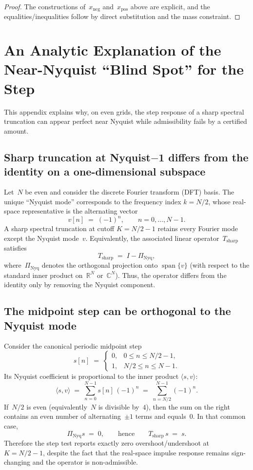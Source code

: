 \documentclass[11pt,a4paper]{article}
\theoremstyle{plain}
\theoremstyle{definition}
\theoremstyle{plain}
\newcommand{\R}{\mathbb{R}}
\newcommand{\xneg}{x_{\mathrm{neg}}}
\newcommand{\xpos}{x_{\mathrm{pos}}}
\DeclareMathOperator{\spn}{span}
\begin{document}
\begin{proof}
The constructions of~$\xneg$ and~$\xpos$ above are explicit, and the
equalities/inequalities follow by direct substitution and the mass constraint.
\end{proof}


\section{An Analytic Explanation of the Near-Nyquist ``Blind Spot'' for the Step}
\label{app:blind-spot}

This appendix explains why, on even grids, the step response of a sharp spectral
truncation can appear perfect near Nyquist while admissibility fails by a
certified amount.


\subsection{Sharp truncation at Nyquist$-$1 differs from the identity on a
  one-dimensional subspace}
\label{app:subspace}

Let~$N$ be even and consider the discrete Fourier transform (DFT) basis.  The
unique ``Nyquist mode'' corresponds to the frequency index $k = N/2$, whose
real-space representative is the alternating vector
\[
  v[n] \;=\; (-1)^n, \qquad n = 0, \dots, N-1.
\]
A sharp spectral truncation at cutoff $K = N/2-1$ retains every Fourier mode
except the Nyquist mode~$v$.  Equivalently, the associated linear
operator~$T_{\mathrm{sharp}}$ satisfies
\[
  T_{\mathrm{sharp}} \;=\; I - \Pi_{\mathrm{Nyq}},
\]
where~$\Pi_{\mathrm{Nyq}}$ denotes the orthogonal projection onto
$\spn\{v\}$ (with respect to the standard inner product on~$\R^N$
or~$\mathbb{C}^N$).  Thus, the operator differs from the identity only by
removing the Nyquist component.


\subsection{The midpoint step can be orthogonal to the Nyquist mode}
\label{app:orthogonal}

Consider the canonical periodic midpoint step
\[
  s[n] \;=\;
  \begin{cases}
    0, & 0 \le n \le N/2-1,\\
    1, & N/2 \le n \le N-1.
  \end{cases}
\]
Its Nyquist coefficient is proportional to the inner product
$\langle s, v \rangle$:
\[
  \langle s, v \rangle
  \;=\;
  \sum_{n=0}^{N-1} s[n]\,(-1)^n
  \;=\;
  \sum_{n=N/2}^{N-1} (-1)^n.
\]
If~$N/2$ is even (equivalently~$N$ is divisible by~$4$), then the sum on the
right contains an even number of alternating~$\pm 1$ terms and equals~$0$.  In
that common case,
\[
  \Pi_{\mathrm{Nyq}} s \;=\; 0,
  \qquad\text{hence}\qquad
  T_{\mathrm{sharp}}\, s \;=\; s.
\]
Therefore the step test reports exactly zero overshoot/undershoot at
$K = N/2-1$, despite the fact that the real-space impulse response remains
sign-changing and the operator is non-admissible.
\end{document}
